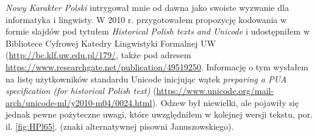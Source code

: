 






\textit{Nowy Karakter Polski} intrygował mnie od dawna jako swoiste
wyzwanie dla informatyka i lingwisty. W 2010 r. przygotowałem
propozycję kodowania w formie slajdów pod tytułem \textit{Historical
  Polish texts and Unicode} i udostępniłem w %
Bibliotece Cyfrowej Katedry Lingwistyki Formalnej UW (\url{http://bc.klf.uw.edu.pl/179/}, także
pod adresem \url{https://www.researchgate.net/publication/49519250}.
Informację
o tym wysłałem na listę użytkowników standardu Unicode inicjując wątek
\textit{preparing a PUA specification (for historical Polish text)}
(\url{https://www.unicode.org/mail-arch/unicode-ml/y2010-m04/0024.html}).
Odzew był niewielki, ale pojawiły się jednak pewne pożyteczne uwagi,
które uwzględniłem w kolejnej wersji tekstu,
por. il. \vref{fig:HPl65}. (znaki alternatywnej pisowni
Januszowskiego).

